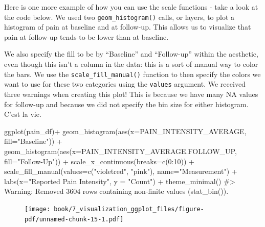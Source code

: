 \documentclass[
  letterpaper,
]{krantz}
\makeatletter
\newenvironment{Shaded}{\begin{snugshade}}{\end{snugshade}}
\newcommand{\AttributeTok}[1]{\textcolor[rgb]{0.40,0.45,0.13}{#1}}
\newcommand{\CommentTok}[1]{\textcolor[rgb]{0.37,0.37,0.37}{#1}}
\newcommand{\DecValTok}[1]{\textcolor[rgb]{0.68,0.00,0.00}{#1}}
\newcommand{\FunctionTok}[1]{\textcolor[rgb]{0.28,0.35,0.67}{#1}}
\newcommand{\NormalTok}[1]{\textcolor[rgb]{0.00,0.23,0.31}{#1}}
\newcommand{\SpecialCharTok}[1]{\textcolor[rgb]{0.37,0.37,0.37}{#1}}
\newcommand{\StringTok}[1]{\textcolor[rgb]{0.13,0.47,0.30}{#1}}
\newenvironment{kframe}{%
\medskip{}
\setlength{\fboxsep}{.8em}
 \def\at@end@of@kframe{}%
 \ifinner\ifhmode%
  \def\at@end@of@kframe{\end{minipage}}%
  \begin{minipage}{\columnwidth}%
 \fi\fi%
 \def\FrameCommand##1{\hskip\@totalleftmargin \hskip-\fboxsep
 \colorbox{shadecolor}{##1}\hskip-\fboxsep
     \hskip-\linewidth \hskip-\@totalleftmargin \hskip\columnwidth}%
 \MakeFramed {\advance\hsize-\width
   \@totalleftmargin\z@ \linewidth\hsize
   \@setminipage}}%
 {\par\unskip\endMakeFramed%
 \at@end@of@kframe}
\renewenvironment{Shaded}{\begin{kframe}}{\end{kframe}}
\makeatother
\begin{document}
Here is one more example of how you can use the scale functions - take a
look at the code below. We used two \texttt{geom\_histogram()} calls, or
layers, to plot a histogram of pain at baseline and at follow-up. This
allows us to visualize that pain at follow-up tends to be lower than at
baseline.

We also specify the fill to be by ``Baseline'' and ``Follow-up'' within
the aesthetic, even though this isn't a column in the data: this is a
sort of manual way to color the bars. We use the
\texttt{scale\_fill\_manual()} function to then specify the colors we
want to use for these two categories using the \texttt{values} argument.
We received three warnings when creating this plot! This is because we
have many NA values for follow-up and because we did not specify the bin
size for either histogram. C'est la vie.

\begin{Shaded}
\begin{Highlighting}[]
\FunctionTok{ggplot}\NormalTok{(pain\_df)}\SpecialCharTok{+}
  \FunctionTok{geom\_histogram}\NormalTok{(}\FunctionTok{aes}\NormalTok{(}\AttributeTok{x=}\NormalTok{PAIN\_INTENSITY\_AVERAGE, }\AttributeTok{fill=}\StringTok{"Baseline"}\NormalTok{)) }\SpecialCharTok{+}
  \FunctionTok{geom\_histogram}\NormalTok{(}\FunctionTok{aes}\NormalTok{(}\AttributeTok{x=}\NormalTok{PAIN\_INTENSITY\_AVERAGE.FOLLOW\_UP, }\AttributeTok{fill=}\StringTok{"Follow{-}Up"}\NormalTok{)) }\SpecialCharTok{+}
  \FunctionTok{scale\_x\_continuous}\NormalTok{(}\AttributeTok{breaks=}\FunctionTok{c}\NormalTok{(}\DecValTok{0}\SpecialCharTok{:}\DecValTok{10}\NormalTok{)) }\SpecialCharTok{+} 
  \FunctionTok{scale\_fill\_manual}\NormalTok{(}\AttributeTok{values=}\FunctionTok{c}\NormalTok{(}\StringTok{"violetred"}\NormalTok{, }\StringTok{"pink"}\NormalTok{), }\AttributeTok{name=}\StringTok{"Measurement"}\NormalTok{) }\SpecialCharTok{+}
  \FunctionTok{labs}\NormalTok{(}\AttributeTok{x=}\StringTok{"Reported Pain Intensity"}\NormalTok{, }\AttributeTok{y =} \StringTok{"Count"}\NormalTok{) }\SpecialCharTok{+}
  \FunctionTok{theme\_minimal}\NormalTok{()}
\CommentTok{\#\textgreater{} Warning: Removed 3604 rows containing non{-}finite values (\textasciigrave{}stat\_bin()\textasciigrave{}).}
\end{Highlighting}
\end{Shaded}

\begin{figure}[H]

{\centering \texttt{[image: book/7\_visualization\_ggplot\_files/figure-pdf/unnamed-chunk-15-1.pdf]}

}

\end{figure}
\end{document}

